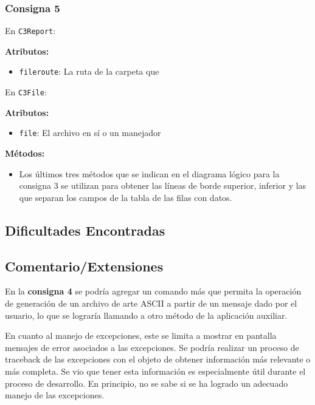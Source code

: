 \documentclass[a4paper,12pt]{article}
\begin{document}
\subsubsection{Consigna 5}

En \texttt{C3Report}:

\textbf{Atributos:}
\begin{itemize}
    \item \texttt{fileroute}: La ruta de la carpeta que 
\end{itemize}
En \texttt{C3File}:

\textbf{Atributos:}
\begin{itemize}
    \item \texttt{file}: El archivo en sí o un manejador 
\end{itemize}

\textbf{Métodos:}
\begin{itemize}
    \item Los últimos tres métodos que se indican en el diagrama lógico para la consigna 3 se utilizan para obtener las líneas de borde superior, inferior y las que separan los campos de la tabla de las filas con datos.
\end{itemize}

\subsection{Dificultades Encontradas}



\subsection{Comentario/Extensiones}
En la \textbf{consigna 4} se podría agregar un comando más que permita la operación de generación de un archivo de arte ASCII a partir de un mensaje dado por el usuario, lo que se lograría llamando a otro método de la aplicación auxiliar.

En cuanto al manejo de excepciones, este se limita a mostrar en pantalla mensajes de error asociados a las excepciones. Se podría realizar un proceso de traceback de las excepciones con el objeto de obtener información más relevante o más completa. Se vio que tener esta información es especialmente útil durante el proceso de desarrollo. En principio, no se sabe si se ha logrado un adecuado manejo de las excepciones.
\end{document}
